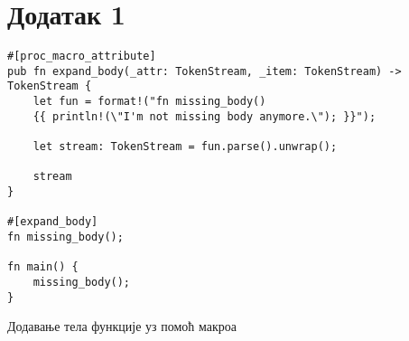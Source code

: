 \section{Додатак 1}

\begin{listing}[H]
\begin{verbatim}
#[proc_macro_attribute]
pub fn expand_body(_attr: TokenStream, _item: TokenStream) -> TokenStream {
    let fun = format!("fn missing_body() 
    {{ println!(\"I'm not missing body anymore.\"); }}");

    let stream: TokenStream = fun.parse().unwrap();

    stream
}

#[expand_body]
fn missing_body();

fn main() {
    missing_body();
}
\end{verbatim}
\caption{Додавање тела функције уз помоћ макроа}
\label{lst:bonus_body_expand}
\end{listing}

\clearpage

